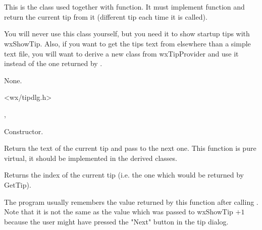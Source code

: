 \section{}\label{wxtipprovider}

This is the class used together with  function.
It must implement  function and return the
current tip from it (different tip each time it is called).

You will never use this class yourself, but you need it to show startup tips
with wxShowTip. Also, if you want to get the tips text from elsewhere than a
simple text file, you will want to derive a new class from wxTipProvider and
use it instead of the one returned by .


None.


<wx/tipdlg.h>


, 


\label{wxtipproviderctor}


Constructor.


\label{wxtipprovidergettip}


Return the text of the current tip and pass to the next one. This function is
pure virtual, it should be implemented in the derived classes.

\label{wxtipprovidergetcurrenttip}


Returns the index of the current tip (i.e. the one which would be returned by
GetTip).

The program usually remembers the value returned by this function after calling 
. Note that it is not the same as the value which
was passed to wxShowTip $+ 1$ because the user might have pressed the "Next"
button in the tip dialog.

